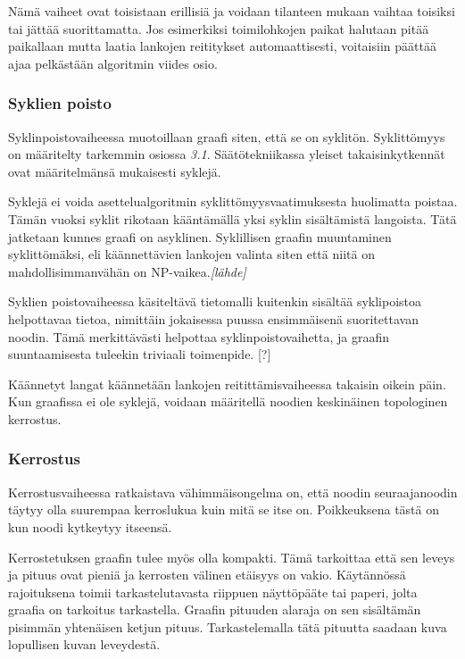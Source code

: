 \documentclass[finnish,12pt]{article}
\begin{document}
Nämä vaiheet ovat toisistaan erillisiä ja voidaan tilanteen mukaan vaihtaa toisiksi tai jättää suorittamatta.
Jos esimerkiksi toimilohkojen paikat halutaan pitää paikallaan mutta laatia lankojen reititykset automaattisesti, voitaisiin päättää ajaa pelkästään algoritmin viides osio.

		
		\subsubsection{Syklien poisto}

Syklinpoistovaiheessa muotoillaan graafi siten, että se on syklitön.
Syklittömyys on määritelty tarkemmin osiossa \emph{3.1}.
Säätötekniikassa yleiset takaisinkytkennät ovat määritelmänsä mukaisesti syklejä.

Syklejä ei voida asettelualgoritmin syklittömyysvaatimuksesta huolimatta poistaa.
Tämän vuoksi syklit rikotaan kääntämällä yksi syklin sisältämistä langoista.
Tätä jatketaan kunnes graafi on asyklinen.
Syklillisen graafin muuntaminen syklittömäksi, eli käännettävien lankojen valinta siten että niitä on mahdollisimmanvähän on NP-vaikea.\emph{[lähde]}

Syklien poistovaiheessa käsiteltävä tietomalli kuitenkin sisältää syklipoistoa helpottavaa tietoa, nimittäin jokaisessa puussa ensimmäisenä suoritettavan noodin. Tämä merkittävästi helpottaa syklinpoistovaihetta, ja graafin suuntaamisesta tuleekin triviaali toimenpide. [?]

Käännetyt langat käännetään lankojen reitittämisvaiheessa takaisin oikein päin.
Kun graafissa ei ole syklejä, voidaan määritellä noodien keskinäinen topologinen kerrostus.

		\subsubsection{Kerrostus}

Kerrostusvaiheessa ratkaistava vähimmäisongelma on, että noodin seuraajanoodin täytyy olla suurempaa kerroslukua kuin mitä se itse on.
Poikkeuksena tästä on kun noodi kytkeytyy itseensä.

Kerrostetuksen graafin tulee myös olla kompakti. Tämä tarkoittaa että sen leveys ja pituus ovat pieniä ja kerrosten välinen etäisyys on vakio. 
Käytännössä rajoituksena toimii tarkastelutavasta riippuen näyttöpääte tai paperi, jolta graafia on tarkoitus tarkastella.
Graafin pituuden alaraja on sen sisältämän pisimmän yhtenäisen ketjun pituus. Tarkastelemalla tätä pituutta saadaan kuva lopullisen kuvan leveydestä.
\end{document}
